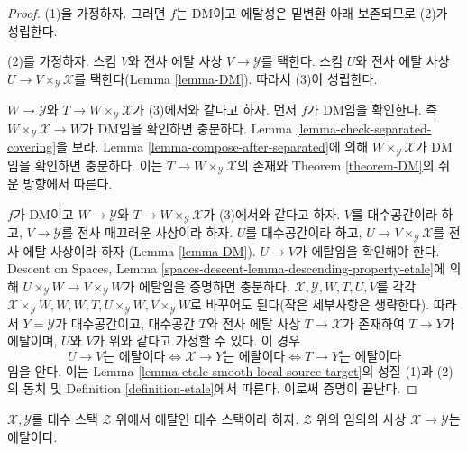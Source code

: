 \begin{proof}
(1)을 가정하자. 그러면 $f$는 DM이고 에탈성은 밑변환 아래 보존되므로
(2)가 성립한다.

\medskip\noindent
(2)를 가정하자. 스킴 $V$와 전사 에탈 사상 $V \to \mathcal{Y}$를
택한다. 스킴 $U$와 전사 에탈 사상
$U \to V \times_\mathcal{Y} \mathcal{X}$를 택한다(Lemma
\ref{lemma-DM}). 따라서 (3)이 성립한다.

\medskip\noindent
$W \to \mathcal{Y}$와 $T \to W \times_\mathcal{Y} \mathcal{X}$가
(3)에서와 같다고 하자. 먼저 $f$가 DM임을 확인한다. 즉
$W \times_\mathcal{Y} \mathcal{X} \to W$가 DM임을 확인하면 충분하다.
Lemma \ref{lemma-check-separated-covering}을 보라. Lemma
\ref{lemma-compose-after-separated}에 의해
$W \times_\mathcal{Y} \mathcal{X}$가 DM임을 확인하면 충분하다. 이는
$T \to W \times_\mathcal{Y} \mathcal{X}$의 존재와 Theorem
\ref{theorem-DM}의 쉬운 방향에서 따른다.

\medskip\noindent
$f$가 DM이고 $W \to \mathcal{Y}$와
$T \to W \times_\mathcal{Y} \mathcal{X}$가 (3)에서와 같다고 하자.
$V$를 대수공간이라 하고, $V \to \mathcal{Y}$를 전사 매끄러운 사상이라
하자. $U$를 대수공간이라 하고,
$U \to V \times_\mathcal{Y} \mathcal{X}$를 전사 에탈 사상이라 하자
(Lemma \ref{lemma-DM}). $U \to V$가 에탈임을 확인해야 한다. Descent on
Spaces, Lemma \ref{spaces-descent-lemma-descending-property-etale}에 의해
$U \times_\mathcal{Y} W \to V \times_\mathcal{Y} W$가 에탈임을 증명하면
충분하다. $\mathcal{X}, \mathcal{Y}, W, T, U, V$를 각각
$\mathcal{X} \times_\mathcal{Y} W, W, W, T, U \times_\mathcal{Y} W,
V \times_\mathcal{Y} W$로 바꾸어도 된다(작은 세부사항은 생략한다).
따라서 $Y = \mathcal{Y}$가 대수공간이고, 대수공간 $T$와 전사 에탈 사상
$T \to \mathcal{X}$가 존재하여 $T \to Y$가 에탈이며, $U$와 $V$가
위와 같다고 가정할 수 있다. 이 경우
$$
U \to V\text{는 에탈이다}
\Leftrightarrow
\mathcal{X} \to Y\text{는 에탈이다}
\Leftrightarrow
T \to Y\text{는 에탈이다}
$$
임을 안다. 이는 Lemma \ref{lemma-etale-smooth-local-source-target}의
성질 (1)과 (2)의 동치 및 Definition \ref{definition-etale}에서 따른다.
이로써 증명이 끝난다.
\end{proof}

\begin{lemma}
\label{lemma-etale-permanence}
$\mathcal{X}, \mathcal{Y}$를 대수 스택 $\mathcal{Z}$ 위에서 에탈인 대수
스택이라 하자. $\mathcal{Z}$ 위의 임의의 사상
$\mathcal{X} \to \mathcal{Y}$는 에탈이다.
\end{lemma}


